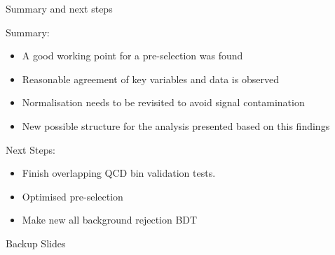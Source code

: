 \documentclass[8pt]{beamer}
\begin{document}
\begin{frame}{Summary and next steps}
 
\begin{block}{Summary:}
 
\begin{itemize}
  \item A good working point for a pre-selection was found
  \item Reasonable agreement of key variables and data is observed
  \item Normalisation needs to be revisited to avoid signal contamination
  \item New possible structure for the analysis presented based on this findings 
\end{itemize}

\end{block}

\begin{block}{Next Steps:}
 
\begin{itemize}
  \item Finish overlapping QCD bin validation tests.
  \item Optimised pre-selection
  \item Make new all background rejection BDT
\end{itemize}
 
\end{block}

\end{frame}


\appendix
\begin{frame}
 
\begin{block}

\begin{center}Backup Slides\end{center}

\end{block}

\end{frame}
\end{document}
